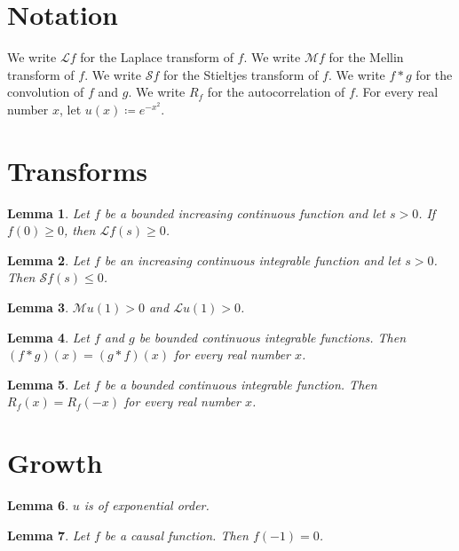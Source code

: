 \documentclass{article}
\newtheorem{lemma}{Lemma}
\begin{document}
\section{Notation}

We write $\mathcal{L}f$ for the Laplace transform of $f$.
We write $\mathcal{M}f$ for the Mellin transform of $f$.
We write $\mathcal{S}f$ for the Stieltjes transform of $f$.
We write $f\ast g$ for the convolution of $f$ and $g$.
We write $R_f$ for the autocorrelation of $f$.
For every real number $x$, let $u(x)\coloneqq e^{-x^2}$.

\section{Transforms}

\begin{lemma}\label{laplace}
Let $f$ be a bounded increasing continuous function and let $s>0$. If $f(0)\ge0$, then $\mathcal{L}f(s)\ge0$.
\end{lemma}

\begin{lemma}\label{stieltjes}
Let $f$ be an increasing continuous integrable function and let $s>0$. Then $\mathcal{S}f(s)\le0$.
\end{lemma}

\begin{lemma}\label{gauss}
$\mathcal{M}u(1)>0$ and $\mathcal{L}u(1)>0$.
\end{lemma}

\begin{lemma}\label{commutative}
Let $f$ and $g$ be bounded continuous integrable functions. Then $(f\ast g)(x)=(g\ast f)(x)$ for every real number $x$.
\end{lemma}

\begin{lemma}\label{even}
Let $f$ be a bounded continuous integrable function. Then $R_f(x)=R_f(-x)$ for every real number $x$.
\end{lemma}

\section{Growth}

\begin{lemma}\label{order}
$u$ is of exponential order.
\end{lemma}

\begin{lemma}\label{causal}
Let $f$ be a causal function. Then $f(-1)=0$.
\end{lemma}
\end{document}
